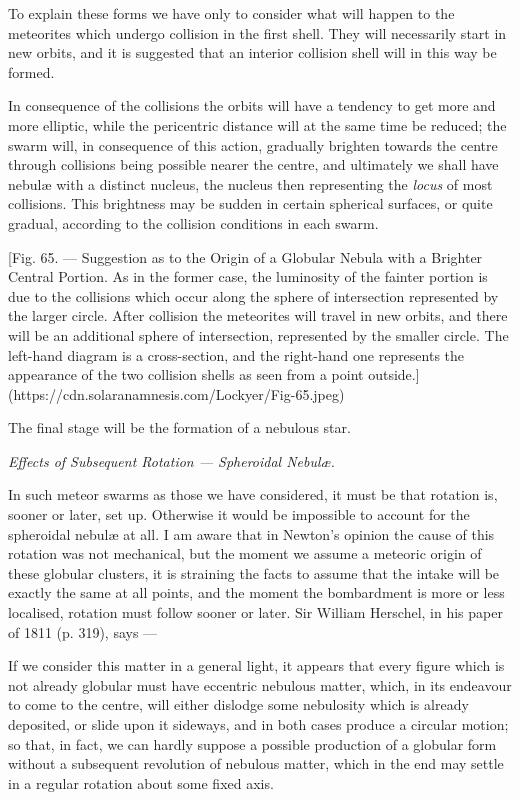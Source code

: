 \documentclass[a4paper, 12pt, oneside, polutonikogreek, english]{article}
\begin{document}
To explain these forms we have only to consider what will happen to the meteorites which undergo collision in the first shell. They will necessarily start in new orbits, and it is suggested that an interior collision shell will in this way be formed.

In consequence of the collisions the orbits will have a tendency to get more and more elliptic, while the pericentric distance will at the same time be reduced; the swarm will, in consequence of this action, gradually brighten towards the centre through collisions being possible nearer the centre, and ultimately we shall have nebulæ with a distinct nucleus, the nucleus then representing the \emph{locus} of most collisions. This brightness may be sudden in certain spherical surfaces, or quite gradual, according to the collision conditions in each swarm.

[Fig. 65. --- Suggestion as to the Origin of a Globular Nebula with a Brighter Central Portion. As in the former case, the luminosity of the fainter portion is due to the collisions which occur along the sphere of intersection represented by the larger circle. After collision the meteorites will travel in new orbits, and there will be an additional sphere of intersection, represented by the smaller circle. The left-hand diagram is a cross-section, and the right-hand one represents the appearance of the two collision shells as seen from a point outside.](https://cdn.solaranamnesis.com/Lockyer/Fig-65.jpeg)

The final stage will be the formation of a nebulous star.

\emph{Effects of Subsequent Rotation --- Spheroidal Nebulæ.}

In such meteor swarms as those we have considered, it must be that rotation is, sooner or later, set up. Otherwise it would be impossible to account for the spheroidal nebulæ at all. I am aware that in Newton's opinion the cause of this rotation was not mechanical, but the moment we assume a meteoric origin of these globular clusters, it is straining the facts to assume that the intake will be exactly the same at all points, and the moment the bombardment is more or less localised, rotation must follow sooner or later. Sir William Herschel, in his paper of 1811 (p. 319), says ---

If we consider this matter in a general light, it appears that every figure which is not already globular must have eccentric nebulous matter, which, in its endeavour to come to the centre, will either dislodge some nebulosity which is already deposited, or slide upon it sideways, and in both cases produce a circular motion; so that, in fact, we can hardly suppose a possible production of a globular form without a subsequent revolution of nebulous matter, which in the end may settle in a regular rotation about some fixed axis.
\end{document}
